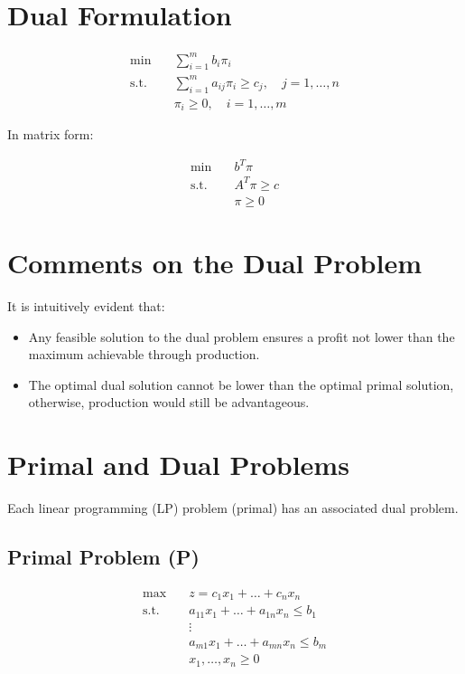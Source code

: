 \documentclass[a4paper, 11pt]{article}
\begin{document}
\section{Dual Formulation}

\begin{align*}
\min & \quad \sum_{i=1}^{m} b_{i} \pi_{i} \\
\text{s.t.} & \quad \sum_{i=1}^{m} a_{ij} \pi_{i} \geq c_{j}, \quad j=1,\dots,n \\
& \quad \pi_{i} \geq 0, \quad i=1,\dots,m
\end{align*}

In matrix form:

\begin{align*}
\min & \quad b^{T} \pi \\
\text{s.t.} & \quad A^{T} \pi \geq c \\
& \quad \pi \geq 0
\end{align*}

\section{Comments on the Dual Problem}

It is intuitively evident that:

\begin{itemize}
    \item Any feasible solution to the dual problem ensures a profit not lower than the maximum achievable through production.
    \item The optimal dual solution cannot be lower than the optimal primal solution, otherwise, production would still be advantageous.
\end{itemize}

\section{Primal and Dual Problems}

Each linear programming (LP) problem (primal) has an associated dual problem.

\subsection{Primal Problem (P)}

\begin{align*}
\max & \quad z = c_{1}x_{1} + \dots + c_{n}x_{n} \\
\text{s.t.} & \quad a_{11}x_{1} + \dots + a_{1n}x_{n} \leq b_{1} \\
& \quad \vdots \\
& \quad a_{m1}x_{1} + \dots + a_{mn}x_{n} \leq b_{m} \\
& \quad x_{1}, \dots, x_{n} \geq 0
\end{align*}
\end{document}
